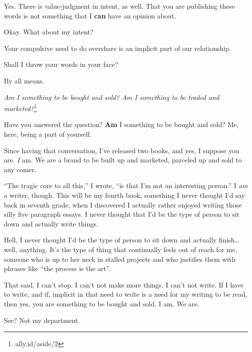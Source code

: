 \begin{paracol}{2}
\begin{leftcolumn}
\begin{ally}
Yes. There is value-judgment in intent, as well. That you are publishing these words is not something that I \textbf{can} have an opinion about.
\end{ally}
Okay. What about my intent?

\begin{ally}
Your compulsive need to do overshare is an implicit part of our relationship.
\end{ally}
Shall I throw your words in your face?

\begin{ally}
By all means.
\end{ally}
\emph{Am I something to be bought and sold? Am I something to be traded and marketed?}\footnote{ally.id/aside/2}

\begin{ally}
Have you answered the question? \textbf{Am} I something to be bought and sold? Me, here, being a part of yourself.
\end{ally}
Since having that conversation, I've released two books, and yes, I suppose you are. \emph{I} am. We are a brand to be built up and marketed, parceled up and sold to any comer.

``The tragic core to all this,'' I wrote, ``is that I'm not an interesting person.'' I \emph{am} a writer, though. This will be my fourth book, something I never thought I'd say back in seventh grade, when I discovered I actually rather enjoyed writing those silly five paragraph essays. I never thought that I'd be the type of person to sit down and actually write things.

Hell, I never thought I'd be the type of person to sit down and actually finish\ldots{}well, anything. It's the type of thing that continually feels out of reach for me, someone who is up to her neck in stalled projects and who justifies them with phrases like ``the process is the art''.

That said, I can't stop. I can't not make more things. I can't not write. If I have to write, and if, implicit in that need to write is a need for my writing to be read, then yes, you are something to be bought and sold. I am. We are.

\begin{ally}
See? Not my department.
\end{ally}
\newpage
  \end{leftcolumn}
\end{paracol}
